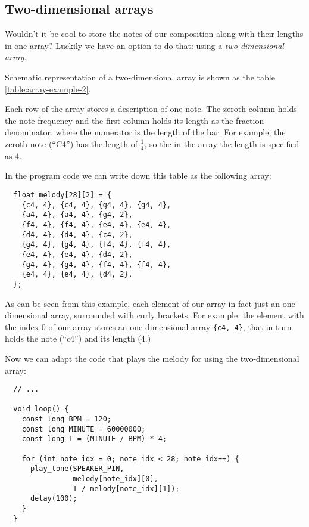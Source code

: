 \documentclass[../sparc.tex]{subfiles}
\begin{document}
\newpage
\subsection{Two-dimensional arrays}

Wouldn't it be cool to store the notes of our composition along with their
lengths in one array?  Luckily we have an option to do that: using a
\emph{two-dimensional array}.

Schematic representation of a two-dimensional array is shown as the table
\ref{table:array-example-2}.


Each row of the array stores a description of one note.  The zeroth column holds
the note frequency and the first column holds its length as the fraction
denominator, where the numerator is the length of the bar.  For example, the
zeroth note (``C4'') has the length of $\frac{1}{4}$, so the in the array the
length is specified as 4.

In the program code we can write down this table as the following array:

\begin{verbatim}
  float melody[28][2] = {
    {c4, 4}, {c4, 4}, {g4, 4}, {g4, 4},
    {a4, 4}, {a4, 4}, {g4, 2},
    {f4, 4}, {f4, 4}, {e4, 4}, {e4, 4},
    {d4, 4}, {d4, 4}, {c4, 2},
    {g4, 4}, {g4, 4}, {f4, 4}, {f4, 4},
    {e4, 4}, {e4, 4}, {d4, 2},
    {g4, 4}, {g4, 4}, {f4, 4}, {f4, 4},
    {e4, 4}, {e4, 4}, {d4, 2},
  };
\end{verbatim}

As can be seen from this example, each element of our array in fact just an
one-dimensional array, surrounded with curly brackets.  For example, the element
with the index 0 of our array stores an one-dimensional array \texttt{\{c4,
 4\}}, that in turn holds the note (``c4'') and its length (4.)

Now we can adapt the code that plays the melody for using the two-dimensional
array:

\begin{verbatim}
  // ...

  void loop() {
    const long BPM = 120;
    const long MINUTE = 60000000;
    const long T = (MINUTE / BPM) * 4;

    for (int note_idx = 0; note_idx < 28; note_idx++) {
      play_tone(SPEAKER_PIN,
                melody[note_idx][0],
                T / melody[note_idx][1]);
      delay(100);
    }
  }
\end{verbatim}
\end{document}
